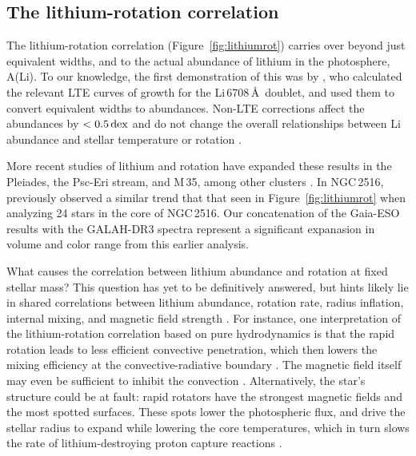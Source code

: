 \documentclass[12pt,twocolumn,tighten]{aastex63}
\newcommand{\cn}{NGC\,2516} %
\begin{document}
\subsection{The lithium-rotation correlation}
\label{discussion:lithium}

The lithium-rotation correlation (Figure~\ref{fig:lithiumrot}) carries
over beyond just equivalent widths, and to the actual abundance of
lithium in the photosphere, A(Li).  To our knowledge, the first
demonstration of this was by \citet{soderblom_evolution_1993}, who
calculated the relevant LTE curves of growth for the Li\,6708\,\AA\
doublet, and used them to convert equivalent widths to abundances.
Non-LTE corrections affect the abundances by $<0.5\,{\rm dex}$ and do
not change the overall relationships between Li abundance and stellar
temperature or rotation \citep{carlsson_1994,lind_departures_2009}.

More recent studies of lithium and rotation have expanded these
results in the Pleiades, the Psc-Eri stream, and M\,35, among other
clusters
\citep{bouvier_pleiades_lirot_2018,arancibia_2020,jeffries_m35_li_2020}.
In \cn, \citet{jeffries_rotation_1998} previously observed a similar
trend that that seen in Figure~\ref{fig:lithiumrot} when analyzing 24
stars in the core of \cn.  Our concatenation of the
\citet{randich_gaiaeso_2018} Gaia-ESO results with the GALAH-DR3
spectra represent a significant expanasion in volume and color range
from this earlier analysis.

What causes the correlation between lithium abundance and rotation at
fixed stellar mass?  This question has yet to be definitively
answered, but hints likely lie in shared correlations between lithium
abundance, rotation rate, radius inflation, internal mixing, and
magnetic field strength
\citep{chabrier_evolution_2007,somers_measurement_2017,jeffries_m35_li_2020}.
For instance, one interpretation of the lithium-rotation correlation
based on pure hydrodynamics is that the rapid rotation leads to less
efficient convective penetration, which then lowers the mixing
efficiency at the convective-radiative boundary
\citep{baraffe_lithium_2017}.  The magnetic field itself may even be
sufficient to inhibit the convection \citep{ventura_Li_B_1998}.
Alternatively, the star's structure could be at fault: rapid rotators
have the strongest magnetic fields and the most spotted surfaces.
These spots lower the photospheric flux, and drive the stellar radius
to expand while lowering the core temperatures, which in turn slows
the rate of lithium-destroying proton capture reactions
\citep{feiden_magnetic_2013,somers_rotation_2015}.  
\end{document}
